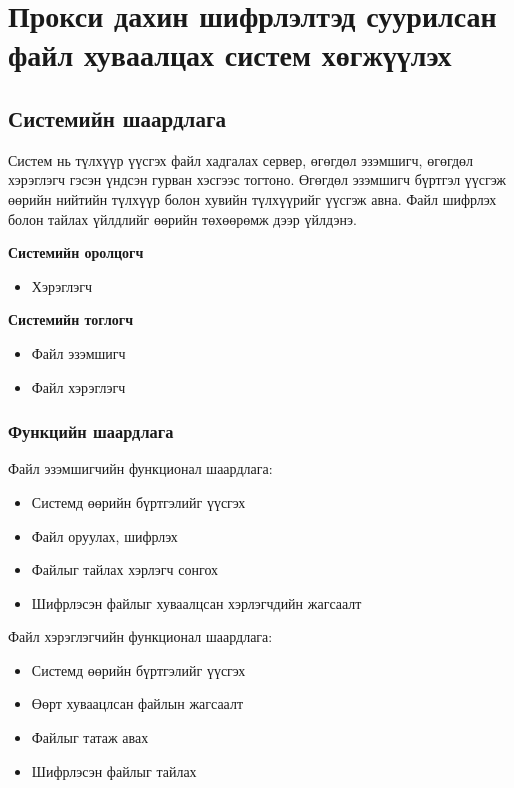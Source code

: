 
\chapter{Прокси дахин шифрлэлтэд суурилсан файл хуваалцах систем хөгжүүлэх}

\label{Chapter3} %
\pagecolor{white}

\section{Системийн шаардлага}
Систем нь түлхүүр үүсгэх файл хадгалах сервер, өгөгдөл эзэмшигч, өгөгдөл хэрэглэгч гэсэн үндсэн гурван хэсгээс тогтоно. Өгөгдөл эзэмшигч бүртгэл үүсгэж өөрийн нийтийн түлхүүр болон хувийн түлхүүрийг үүсгэж авна. Файл шифрлэх болон тайлах үйлдлийг өөрийн төхөөрөмж дээр үйлдэнэ.

\textbf{Системийн оролцогч}
\begin{itemize}
    \item Хэрэглэгч
\end{itemize}

\textbf{Системийн тоглогч}
\begin{itemize}
    \item Файл эзэмшигч
    \item Файл хэрэглэгч
\end{itemize}

\subsection*{Функцийн шаардлага}
Файл эзэмшигчийн функционал шаардлага:
\begin{itemize}
    \item Системд өөрийн бүртгэлийг үүсгэх
    \item Файл оруулах, шифрлэх
    \item Файлыг тайлах хэрлэгч сонгох
    \item Шифрлэсэн файлыг хуваалцсан хэрлэгчдийн жагсаалт
\end{itemize}
Файл хэрэглэгчийн функционал шаардлага:
\begin{itemize}
    \item Системд өөрийн бүртгэлийг үүсгэх
    \item Өөрт хуваацлсан файлын жагсаалт
    \item Файлыг татаж авах
    \item Шифрлэсэн файлыг тайлах
\end{itemize}

